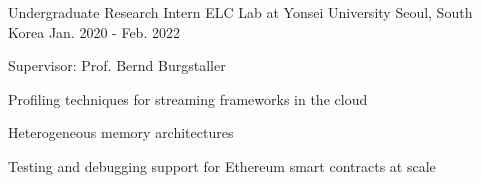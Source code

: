 

\begin{cventries}

  \cventry
    {Undergraduate Research Intern} %
    {ELC Lab at Yonsei University} %
    {Seoul, South Korea} %
    {Jan. 2020 - Feb. 2022} %
    {
      \begin{cvitems} %
        \item {Supervisor: Prof. Bernd Burgstaller}
        \item {Profiling techniques for streaming frameworks in the cloud}
        \item {Heterogeneous memory architectures}
        \item {Testing and debugging support for Ethereum smart contracts at scale}
      \end{cvitems}
    }

\end{cventries}
